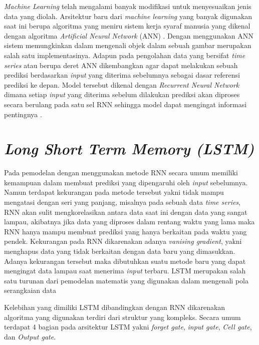 \textit{Machine Learning} telah mengalami banyak modifikasi untuk menyesuaikan jenis data yang diolah.  Arsitektur baru dari \textit{machine learning} yang banyak digunakan saat ini berupa algoritma yang meniru sistem kerja syaraf manusia yang dikenal dengan algoritma \textit{Artificial Neural Network} (ANN) \cite{braspenning1995artificial}. Dengan menggunakan ANN sistem memungkinkan dalam mengenali objek dalam sebuah gambar merupakan salah satu implementasinya. Adapun pada pengolahan data yang bersifat \textit{time series} atau berupa deret ANN dikembangkan agar dapat melakukan sebuah prediksi berdasarkan \textit{input} yang diterima sebelumnya sebagai dasar referensi prediksi ke depan. Model tersebut dikenal dengan \textit{Recurrent Neural Network} dimana setiap \textit{input} yang diterima sebelum dilakukan prediksi akan diproses secara berulang pada satu sel RNN sehingga model dapat mengingat informasi pentingnya \cite{medsker2001recurrent}.


\section{\textit{Long Short Term Memory (LSTM)}}
Pada pemodelan dengan menggunakan metode RNN secara umum memiliki kemampuan dalam membuat prediksi yang dipengaruhi oleh \textit{input} sebelumnya. Namun terdapat kekurangan pada metode tersebut yakni tidak mampu mengatasi dengan  seri yang panjang, misalnya pada sebuah data \textit{time series}, RNN akan sulit mengkorelasikan antara data saat ini dengan data yang sangat lampau, akibatnya jika data yang diproses dalam rentang waktu yang lama maka RNN hanya mampu membuat prediksi yang hanya berkaitan pada waktu yang pendek. Kekurangan pada RNN dikarenakan adanya \textit{vanising gradient}, yakni menghapus data yang tidak berkaitan dengan data baru yang dimasukkan. Adanya kekurangan tersebut maka dibutuhkan suatu metode baru yang dapat mengingat data lampau saat menerima \textit{input} terbaru. 
LSTM merupakan salah satu turunan dari pemodelan matematis yang digunakan dalam mengenali pola serangkaian data 

Kelebihan yang dimiliki LSTM dibandingkan dengan RNN dikarenakan algoritma yang digunakan terdiri dari struktur yang kompleks. Secara umum terdapat 4 bagian pada arsitektur LSTM yakni \textit{forget gate}, \textit{input gate}, \textit{Cell gate}, dan \textit{Output gate}. 
